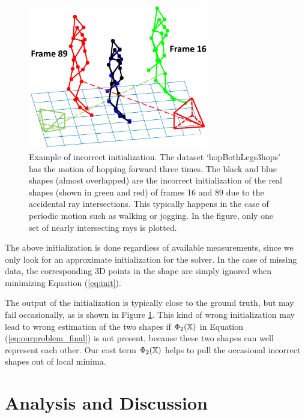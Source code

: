 \begin{figure}
\centering
\includegraphics[width=0.70\textwidth]{chapter5/resource/wrong_init.pdf}
\caption{Example of incorrect initialization. The dataset `hopBothLegs3hops' \cite{cg-2007-2} has the motion of hopping forward three times. The black and blue shapes (almost overlapped) are the incorrect initialization of the real shapes (shown in green and red) of frames 16 and 89 due to the accidental ray intersections. This typically happens in the case of  periodic motion such as walking or jogging. In the figure, only one set of nearly intersecting rays is plotted.}
\label{fig:init}
\end{figure}

The above initialization is done regardless of available measurements, since we only look for an approximate initialization for the solver. In the case of missing data, the corresponding 3D points in the shape are simply ignored when minimizing Equation (\ref{eq:init}).

The output of the initialization is typically close to the ground truth, but may fail occasionally, as is shown in Figure \ref{fig:init}. This kind of wrong initialization may lead to wrong estimation of the two shapes if $\Phi_2(\mathbb X)$ in Equation (\ref{eq:ourproblem_final}) is not present, because these two shapes can well represent each other. Our cost term $\Phi_2(\mathbb X)$ helps to pull the occasional incorrect shapes out of local minima.



\section{Analysis and Discussion}	\label{sec:reconstructability}

